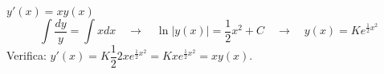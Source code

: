 \begin{example}
 $y'(x) = x y(x)$
\begin{equation}
 \int \dfrac{dy}{y} = \int x dx \quad \rightarrow \quad
 \ln|y(x)| = \dfrac{1}{2} x^2 + C \quad \rightarrow \quad
 y(x) = K e^{\frac{1}{2} x^2}
\end{equation}
Verifica: $y'(x) = K \dfrac{1}{2} 2 x e^{\frac{1}{2}x^2} = K x e^{\frac{1}{2}x^2} = x y(x)$.
\end{example}




